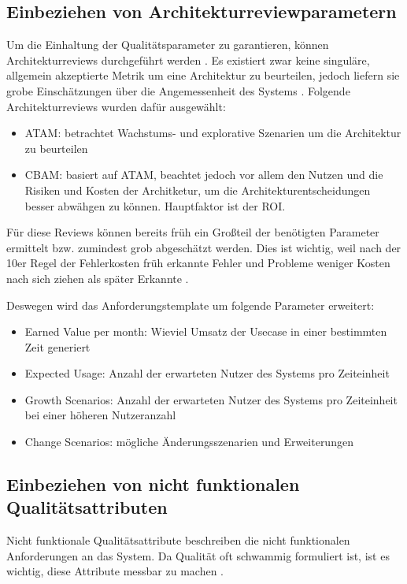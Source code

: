 \subsection{Einbeziehen von Architekturreviewparametern}
Um die Einhaltung der Qualitätsparameter zu garantieren, können Architekturreviews durchgeführt werden \cite[S. 20]{review}. Es existiert zwar \glqq keine singuläre, allgemein akzeptierte Metrik um eine Architektur zu beurteilen\grqq \cite[S. 19]{review}, jedoch liefern sie grobe Einschätzungen über die Angemessenheit des Systems \cite[S. 20]{review}. Folgende Architekturreviews wurden dafür ausgewählt:

\begin{itemize}
  \item ATAM: betrachtet Wachstums- und explorative Szenarien um die Architektur zu beurteilen \cite[S. 61]{review}
  \item CBAM: basiert auf ATAM, beachtet jedoch vor allem den Nutzen und die Risiken und Kosten der Architketur, um die Architekturentscheidungen besser abwähgen zu können. Hauptfaktor ist der ROI. \cite[S. 67]{review}
\end{itemize}

Für diese Reviews können bereits früh ein Großteil der benötigten Parameter ermittelt bzw. zumindest grob abgeschätzt werden. Dies ist wichtig, weil nach der 10er Regel der Fehlerkosten früh erkannte Fehler und Probleme weniger Kosten nach sich ziehen als später Erkannte \cite[S. 154]{fehler}.

Deswegen wird das Anforderungstemplate um folgende Parameter erweitert:

\begin{itemize}
  \item Earned Value per month: Wieviel Umsatz der Usecase in einer bestimmten Zeit generiert
  \item Expected Usage: Anzahl der erwarteten Nutzer des Systems pro Zeiteinheit
  \item Growth Scenarios: Anzahl der erwarteten Nutzer des Systems pro Zeiteinheit bei einer höheren Nutzeranzahl
  \item Change Scenarios: mögliche Änderungsszenarien und Erweiterungen
\end{itemize}

\subsection{Einbeziehen von nicht funktionalen Qualitätsattributen}
Nicht funktionale Qualitätsattribute beschreiben die nicht funktionalen Anforderungen an das System. Da Qualität oft schwammig formuliert ist, ist es wichtig, diese Attribute messbar zu machen \cite[S. 9]{effektiv}.

